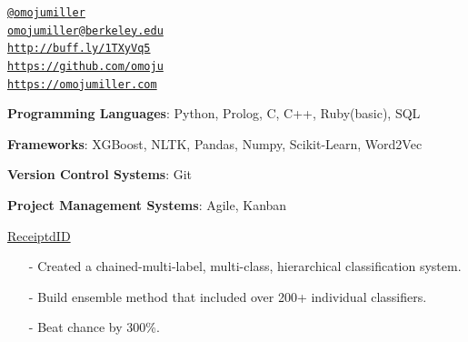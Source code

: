 \documentclass[11pt,article,oneside]{memoir}
\makeatletter
\def\myemail{omojumiller@berkeley.edu}
\def\myweb{https://omojumiller.com}
\def\mytwitter{@omojumiller}
\def\mylinkedin{http://buff.ly/1TXyVq5}
\def\mygithub{https://github.com/omoju}
\makeatother
\begin{document}
\begin{minipage}[t]{2.95in}

\end{minipage}
\hfill
\hfill
\begin{minipage}[t]{2in}
  \flushright \footnotesize  \addressblock
  {\scriptsize  \texttt{\href{http://twitter.com/omojumiller}{\mytwitter}} \, \faTwitter }  \\
  {\scriptsize  \texttt{\href{mailto:\myemail}{\myemail}} \, \faEnvelope} \\
  {\scriptsize  \texttt{\href{\mylinkedin}{\mylinkedin}} \, \faLinkedin} \\
  {\scriptsize  \texttt{\href{\mygithub}{\mygithub}} \, \faGithub} \\
  {\scriptsize  \texttt{\href{\myweb}{\myweb}} \, \faGlobe}
\end{minipage}

\medskip

\reversemarginpar

\bigskip

\medskip

\ind \textbf{Programming Languages}: Python, Prolog, C, C++, Ruby(basic), SQL

\ind \textbf{Frameworks}: XGBoost, NLTK, Pandas, Numpy, Scikit-Learn, Word2Vec

\ind \textbf{Version Control Systems}: Git

\ind \textbf{Project Management Systems}: Agile, Kanban


\medskip

\ind \href{https://github.com/omoju/receiptdID}{ReceiptdID}
\begin{itemize}[noitemsep,nolistsep]
\item[-] Created a chained-multi-label, multi-class, hierarchical classification system.
\item[-] Build ensemble method that included over 200+ individual classifiers.
\item[-] Beat chance by 300\%.
\end{itemize}
\end{document}
